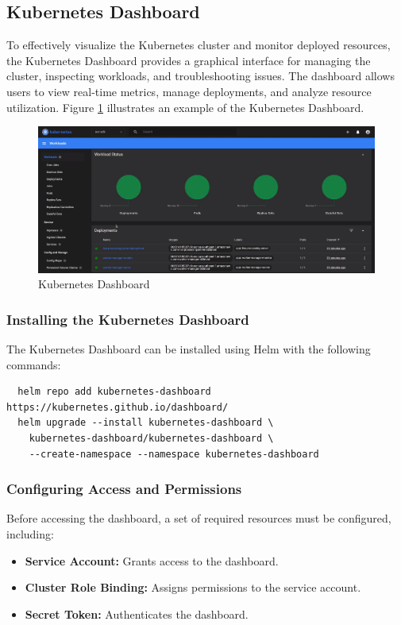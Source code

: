 \subsection{Kubernetes Dashboard}
To effectively visualize the Kubernetes cluster and monitor deployed resources, the Kubernetes Dashboard provides a graphical interface for managing the cluster, inspecting workloads, and troubleshooting issues. The dashboard allows users to view real-time metrics, manage deployments, and analyze resource utilization. Figure \ref{fig:kubernetes_dashboard} illustrates an example of the Kubernetes Dashboard.
\begin{figure}[ht]
  \centering
  \includegraphics[width=\textwidth]{figures/kubernetes_dashboard.png}
  \caption{Kubernetes Dashboard}
  \label{fig:kubernetes_dashboard}
\end{figure}

\subsubsection{Installing the Kubernetes Dashboard}
The Kubernetes Dashboard can be installed using Helm with the following commands:

\begin{verbatim}
  helm repo add kubernetes-dashboard https://kubernetes.github.io/dashboard/
  helm upgrade --install kubernetes-dashboard \
    kubernetes-dashboard/kubernetes-dashboard \
    --create-namespace --namespace kubernetes-dashboard
\end{verbatim}

\subsubsection{Configuring Access and Permissions}
Before accessing the dashboard, a set of required resources must be configured, including:

\begin{itemize}
  \item \textbf{Service Account:} Grants access to the dashboard.
  \item \textbf{Cluster Role Binding:} Assigns permissions to the service account.
  \item \textbf{Secret Token:} Authenticates the dashboard.
\end{itemize}

